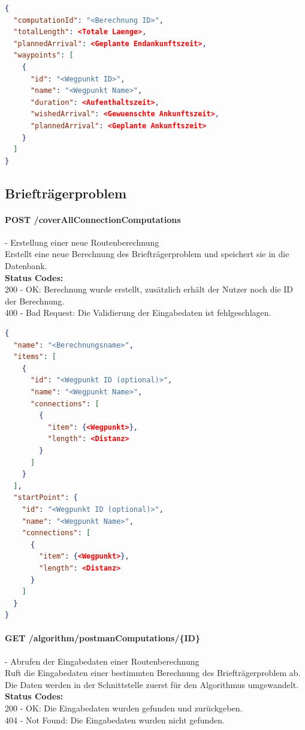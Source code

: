 \begin{lstlisting}[language=JSON, caption=Beispiel eines Endresultates für das Problem des Handlungsreisenden, label=lst:solution_tsp]  
{
  "computationId": "<Berechnung ID>",
  "totalLength": <Totale Laenge>,
  "plannedArrival": <Geplante Endankunftszeit>,
  "waypoints": [
    {
      "id": "<Wegpunkt ID>",
      "name": "<Wegpunkt Name>",
      "duration": <Aufenthaltszeit>,
      "wishedArrival": <Gewuenschte Ankunftszeit>,
      "plannedArrival": <Geplante Ankunftszeit>
    }
  ]
}
\end{lstlisting}

%
%
%
%

\subsection{Briefträgerproblem}

\paragraph{POST /coverAllConnectionComputations} - Erstellung einer neue Routenberechnung\mbox{}\\
Erstellt eine neue Berechnung des Briefträgerproblem und speichert sie in die Datenbank.\\
\textbf{Status Codes:}\\
200 - OK: Berechnung wurde erstellt, zusätzlich erhält der Nutzer noch die ID der Berechnung.\\
400 - Bad Request: Die Validierung der Eingabedaten ist fehlgeschlagen.\\

\begin{lstlisting}[language=JSON, caption=Beispiel einer Eingabe für das Briefträgerproblem, label=lst:input_postman]  
{
  "name": "<Berechnungsname>",
  "items": [
    {
      "id": "<Wegpunkt ID (optional)>",
      "name": "<Wegpunkt Name>",
      "connections": [
        {
          "item": {<Wegpunkt>},
          "length": <Distanz>
        }
      ]
    }
  ],
  "startPoint": {
    "id": "<Wegpunkt ID (optional)>",
    "name": "<Wegpunkt Name>",
    "connections": [
      {
        "item": {<Wegpunkt>},
        "length": <Distanz>
      }
    ]
  }
}
\end{lstlisting}

\paragraph{GET /algorithm/postmanComputations/\{ID\}} - Abrufen der Eingabedaten einer Routenberechnung\mbox{}\\
Ruft die Eingabedaten einer bestimmten Berechnung des Briefträgerproblem ab. Die Daten werden in der Schnittstelle zuerst für den Algorithmus umgewandelt.\\
\textbf{Status Codes:}\\
200 - OK: Die Eingabedaten wurden gefunden und zurückgeben.\\
404 - Not Found: Die Eingabedaten wurden nicht gefunden.\\

